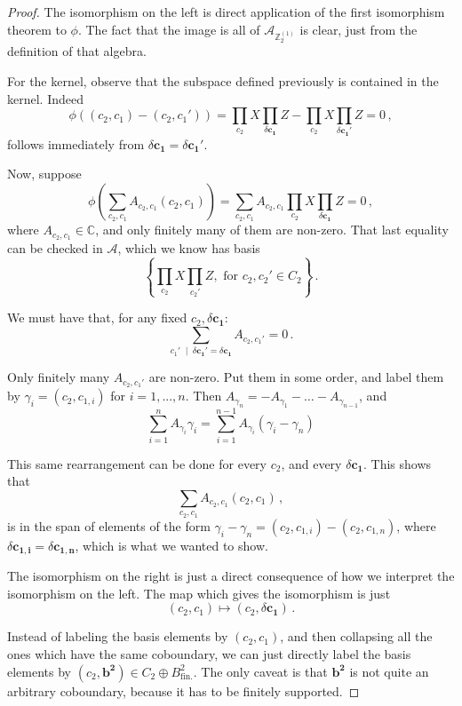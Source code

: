 \documentclass[aps,twocolumn,prx,floatfix,preprintnumbers, nofootinbib,10pt]{revtex4-2}
\numberwithin{equation}{section}
\theoremstyle{definition}
\theoremstyle{remark}
\theoremstyle{claim}
\newcommand{\be}{\begin{equation}}
\newcommand{\ee}{\end{equation}}
\newcommand{\Z}{{\mathbb Z}}
\newcommand{\mc}[1]{\mathcal{#1}}
\newcommand{\paren}[1]{\left( #1 \right)}
\newcommand{\curpar}[1]{\left\{ #1 \right\}}
\begin{document}
\begin{proof}
 The isomorphism on the left is direct application of the first isomorphism theorem to $\phi$. The fact that the image is all of $\mc{A}_{\Z_2^{(1)}}$ is clear, just from the definition of that algebra.

 For the kernel, observe that the subspace defined previously is contained in the kernel. Indeed
 \be
 \phi((c_2, c_1) - (c_2, c_1')) = \prod_{c_2} X \prod_{\delta \bm{c_1}} Z - \prod_{c_2} X \prod_{\delta \bm{c_1'}} Z = 0 \,,
 \ee
 follows immediately from $\delta \bm{c_1} = \delta \bm{c_1'}$.

 Now, suppose
 \be
 \phi\paren{ \sum_{c_2, c_1} A_{c_2, c_1} (c_2, c_1) } = \sum_{c_2, c_1} A_{c_2, c_1} \prod_{c_2} X \prod_{\delta \bm{c_1}} Z = 0 \,,
 \ee
 where $A_{c_2, c_1} \in \mathbb{C}$, and only finitely many of them are non-zero. That last equality can be checked in $\mc{A}$, which we know has basis
 \be
 \curpar{ \prod_{c_2} X \prod_{c_2'} Z, \text{ for } c_2, c_2' \in C_2} \,.
 \ee

 We must have that, for any fixed $c_2, \delta \bm{c_1}$:
 \be
 \sum_{c_1' \; \mid \; \delta \bm{c_1'} = \delta \bm{c_1}} A_{c_2, c_1'} = 0 \,.
 \ee

 Only finitely many $A_{c_2, c_1'}$ are non-zero. Put them in some order, and label them by $\gamma_i = (c_2, c_{1, i})$ for $i = 1, ..., n$. Then $A_{\gamma_n} = - A_{\gamma_1} - \dots - A_{\gamma_{n-1}}$, and
 \be
 \sum_{i = 1}^n A_{\gamma_i} \gamma_i = \sum_{i = 1}^{n-1} A_{\gamma_i} \paren{\gamma_i - \gamma_n}
 \ee

 This same rearrangement can be done for every $c_2$, and every $\delta \bm{c_1}$. This shows that
 \be
 \sum_{c_2, c_1} A_{c_2, c_1} (c_2, c_1) \,,
 \ee
 is in the span of elements of the form $\gamma_i - \gamma_n = (c_2, c_{1, i}) - (c_2, c_{1, n})$, where $\delta \bm{c_{1, i}} = \delta\bm{c_{1, n}}$, which is what we wanted to show.

 The isomorphism on the right is just a direct consequence of how we interpret the isomorphism on the left. The map which gives the isomorphism is just
 \be
 (c_2, c_1) \longmapsto (c_2, \delta \bm{c_1}) \,.
 \ee
 
 Instead of labeling the basis elements by $(c_2, c_1)$, and then collapsing all the ones which have the same coboundary, we can just directly label the basis elements by $(c_2, \bm{b^2}) \in C_2 \oplus B^2_\text{fin.}$. The only caveat is that $\bm{b^2}$ is not quite an arbitrary coboundary, because it has to be finitely supported.
\end{proof}
\end{document}
